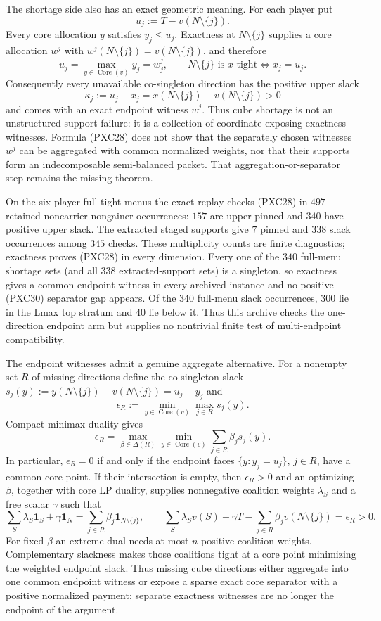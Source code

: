 \documentclass[11pt]{article}
\newcommand{\core}{\operatorname{Core}}
\newcommand{\one}{\mathbf 1}
\begin{document}
The shortage side also has an exact geometric meaning.  For each player put
\[
 u_j:=T-v(N\setminus\{j\}).
\]
Every core allocation $y$ satisfies $y_j\le u_j$.  Exactness at
$N\setminus\{j\}$ supplies a core allocation $w^j$ with
$w^j(N\setminus\{j\})=v(N\setminus\{j\})$, and therefore
\[
 u_j=\max_{y\in\core(v)}y_j=w^j_j,
 \qquad
 N\setminus\{j\}\text{ is $x$-tight}
 \Longleftrightarrow x_j=u_j.                       \tag{PXC28}
\]
Consequently every unavailable co-singleton direction has the positive upper
slack
\[
 \kappa_j:=u_j-x_j
   =x(N\setminus\{j\})-v(N\setminus\{j\})>0
\]
and comes with an exact endpoint witness $w^j$.  Thus cube shortage is not an
unstructured support failure: it is a collection of coordinate-exposing
exactness witnesses.  Formula (PXC28) does not show that the separately
chosen witnesses $w^j$ can be aggregated with common normalized weights, nor
that their supports form an indecomposable semi-balanced packet.  That
aggregation-or-separator step remains the missing theorem.

On the six-player full tight menus the exact replay checks (PXC28) in $497$
retained noncarrier nongainer occurrences: $157$ are upper-pinned and $340$
have positive upper slack.  The extracted staged supports give $7$ pinned and
$338$ slack occurrences among $345$ checks.  These multiplicity counts are
finite diagnostics; exactness proves (PXC28) in every dimension.  Every one
of the $340$ full-menu shortage sets (and all $338$ extracted-support sets)
is a singleton, so exactness gives a common endpoint witness in every
archived instance and no positive (PXC30) separator gap appears.  Of the
$340$ full-menu slack occurrences, $300$ lie in the Lmax top stratum and
$40$ lie below it.  Thus this archive checks the one-direction endpoint arm
but supplies no nontrivial finite test of multi-endpoint compatibility.

The endpoint witnesses admit a genuine aggregate alternative.  For a
nonempty set $R$ of missing directions define the co-singleton slack
$s_j(y):=y(N\setminus\{j\})-v(N\setminus\{j\})=u_j-y_j$ and
\[
 \epsilon_R:=\min_{y\in\core(v)}\max_{j\in R}s_j(y).
\]
Compact minimax duality gives
\[
 \epsilon_R
  =\max_{\beta\in\Delta(R)}\min_{y\in\core(v)}
       \sum_{j\in R}\beta_js_j(y).                   \tag{PXC29}
\]
In particular, $\epsilon_R=0$ if and only if the endpoint faces
$\{y:y_j=u_j\}$, $j\in R$, have a common core point.  If their intersection
is empty, then $\epsilon_R>0$ and an optimizing $\beta$, together with core
LP duality, supplies nonnegative coalition weights $\lambda_S$ and a free
scalar $\gamma$ such that
\[
 \sum_S\lambda_S\one_S+\gamma\one_N
   =\sum_{j\in R}\beta_j\one_{N\setminus\{j\}},
 \qquad
 \sum_S\lambda_Sv(S)+\gamma T
  -\sum_{j\in R}\beta_jv(N\setminus\{j\})
   =\epsilon_R>0.                                    \tag{PXC30}
\]
For fixed $\beta$ an extreme dual needs at most $n$ positive coalition
weights.  Complementary slackness makes those coalitions tight at a core
point minimizing the weighted endpoint slack.  Thus missing cube directions
either aggregate into one common endpoint witness or expose a sparse exact
core separator with a positive normalized payment; separate exactness
witnesses are no longer the endpoint of the argument.
\end{document}
